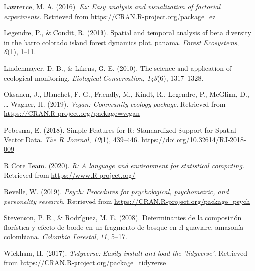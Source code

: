 \documentclass[11pt,]{article}
\begin{document}
\hypertarget{ref-EZ}{}
Lawrence, M. A. (2016). \emph{Ez: Easy analysis and visualization of
factorial experiments}. Retrieved from
\url{https://CRAN.R-project.org/package=ez}

\hypertarget{ref-legendre2019spatial}{}
Legendre, P., \& Condit, R. (2019). Spatial and temporal analysis of
beta diversity in the barro colorado island forest dynamics plot,
panama. \emph{Forest Ecosystems}, \emph{6}(1), 1--11.

\hypertarget{ref-lindenmayer2010science}{}
Lindenmayer, D. B., \& Likens, G. E. (2010). The science and application
of ecological monitoring. \emph{Biological Conservation}, \emph{143}(6),
1317--1328.

\hypertarget{ref-VeganPack}{}
Oksanen, J., Blanchet, F. G., Friendly, M., Kindt, R., Legendre, P.,
McGlinn, D., \ldots{} Wagner, H. (2019). \emph{Vegan: Community ecology
package}. Retrieved from \url{https://CRAN.R-project.org/package=vegan}

\hypertarget{ref-sfpackage}{}
Pebesma, E. (2018). Simple Features for R: Standardized Support for
Spatial Vector Data. \emph{The R Journal}, \emph{10}(1), 439--446.
\url{https://doi.org/10.32614/RJ-2018-009}

\hypertarget{ref-RSoft}{}
R Core Team. (2020). \emph{R: A language and environment for statistical
computing}. Retrieved from \url{https://www.R-project.org/}

\hypertarget{ref-psych}{}
Revelle, W. (2019). \emph{Psych: Procedures for psychological,
psychometric, and personality research}. Retrieved from
\url{https://CRAN.R-project.org/package=psych}

\hypertarget{ref-stevenson2008determinantes}{}
Stevenson, P. R., \& Rodríguez, M. E. (2008). Determinantes de la
composición florística y efecto de borde en un fragmento de bosque en el
guaviare, amazonía colombiana. \emph{Colombia Forestal}, \emph{11},
5--17.

\hypertarget{ref-Tidyverse}{}
Wickham, H. (2017). \emph{Tidyverse: Easily install and load the
'tidyverse'}. Retrieved from
\url{https://CRAN.R-project.org/package=tidyverse}




\newpage
\singlespacing 
\end{document}
